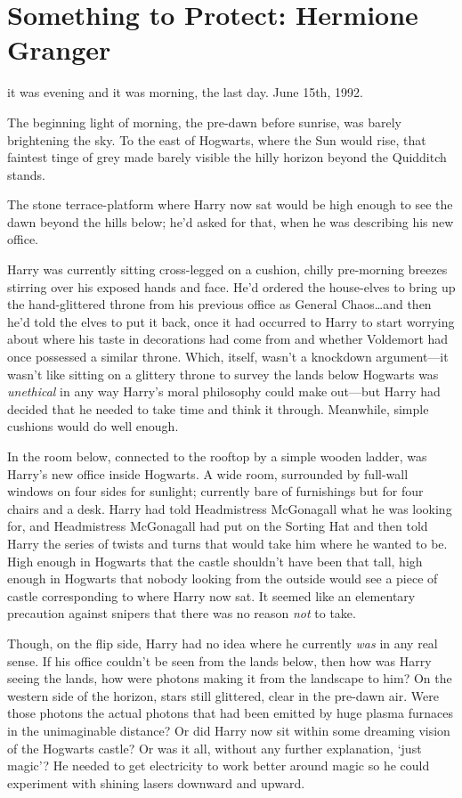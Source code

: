 \chapter{Something to Protect: Hermione Granger}

 it was evening and it was morning, the last day. June 15th, 1992.

\hplettrineextrapara
The beginning light of morning, the pre-dawn before sunrise, was barely brightening the sky. To the east of Hogwarts, where the Sun would rise, that faintest tinge of grey made barely visible the hilly horizon beyond the Quidditch stands.

The stone terrace-platform where Harry now sat would be high enough to see the dawn beyond the hills below; he’d asked for that, when he was describing his new office.

Harry was currently sitting cross-legged on a cushion, chilly pre-morning breezes stirring over his exposed hands and face. He’d ordered the house-elves to bring up the hand-glittered throne from his previous office as General Chaos…and then he’d told the elves to put it back, once it had occurred to Harry to start worrying about where his taste in decorations had come from and whether Voldemort had once possessed a similar throne. Which, itself, wasn’t a knockdown argument—it wasn’t like sitting on a glittery throne to survey the lands below Hogwarts was \emph{unethical} in any way Harry’s moral philosophy could make out—but Harry had decided that he needed to take time and think it through. Meanwhile, simple cushions would do well enough.

In the room below, connected to the rooftop by a simple wooden ladder, was Harry’s new office inside Hogwarts. A wide room, surrounded by full-wall windows on four sides for sunlight; currently bare of furnishings but for four chairs and a desk. Harry had told Headmistress McGonagall what he was looking for, and Headmistress McGonagall had put on the Sorting Hat and then told Harry the series of twists and turns that would take him where he wanted to be. High enough in Hogwarts that the castle shouldn’t have been that tall, high enough in Hogwarts that nobody looking from the outside would see a piece of castle corresponding to where Harry now sat. It seemed like an elementary precaution against snipers that there was no reason \emph{not} to take.

Though, on the flip side, Harry had no idea where he currently \emph{was} in any real sense. If his office couldn’t be seen from the lands below, then how was Harry seeing the lands, how were photons making it from the landscape to him? On the western side of the horizon, stars still glittered, clear in the pre-dawn air. Were those photons the actual photons that had been emitted by huge plasma furnaces in the unimaginable distance? Or did Harry now sit within some dreaming vision of the Hogwarts castle? Or was it all, without any further explanation, ‘just magic’? He needed to get electricity to work better around magic so he could experiment with shining lasers downward and upward.

